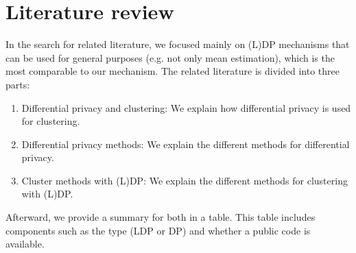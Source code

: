 \section{Literature review} \label{theory:literature-review}
In the search for related literature, we focused mainly on (L)DP mechanisms that can be used for general purposes (e.g. not only mean estimation), which is the most comparable to our mechanism.
The related literature is divided into three parts:
\begin{enumerate}
    \item Differential privacy and clustering: We explain how differential privacy is used for clustering.
    \item Differential privacy methods: We explain the different methods for differential privacy.
    \item Cluster methods with (L)DP: We explain the different methods for clustering with (L)DP.
\end{enumerate}
Afterward, we provide a summary for both in a table.
This table includes components such as the type (LDP or DP) and whether a public code is available.

